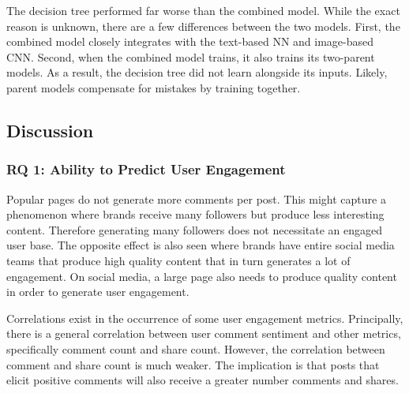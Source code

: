 \documentclass[mksc,blindrev]{informs3} %
\begin{document}
The decision tree performed far worse than the combined model. While the exact reason is unknown, there are a few differences between the two models. First, the combined model closely integrates with the text-based NN and image-based CNN. Second, when the combined model trains, it also trains its two-parent models. As a result, the decision tree did not learn alongside its inputs. Likely, parent models compensate for mistakes by training together.

\subsection{Discussion}

\subsubsection{RQ 1: Ability to Predict User Engagement}

Popular pages do not generate more comments per post. This might capture a phenomenon where brands receive many followers but produce less interesting content. Therefore generating many followers does not necessitate an engaged user base. The opposite effect is also seen where brands have entire social media teams that produce high quality content that in turn generates a lot of engagement. On social media, a large page also needs to produce quality content in order to generate user engagement.

Correlations exist in the occurrence of some user engagement metrics. Principally, there is a general correlation between user comment sentiment and other metrics, specifically comment count and share count. However, the correlation between comment and share count is much weaker. The implication is that posts that elicit positive comments will also receive a greater number comments and shares. 

\end{document}
